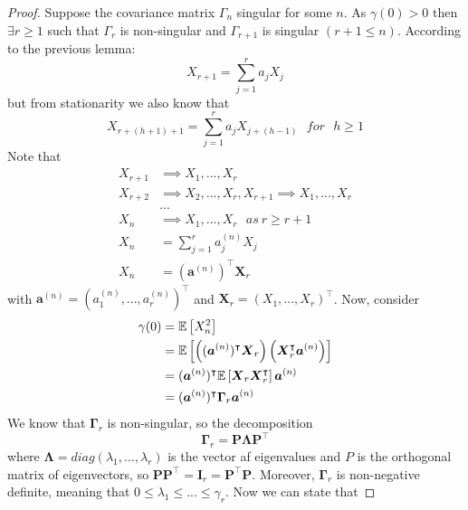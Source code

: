 \begin{proof}
    Suppose the covariance matrix $\Gamma_n$ singular for some $n$. As $\gamma(0)>0$ then $\exists r\ge1$ such that $\Gamma_r$ is non-singular and $\Gamma_{r+1}$ is singular $(r+1\le n)$. According to the previous lemma:
    \[
        X_{r+1}=\sum_{j=1}^ra_jX_j  
    \]
    but from stationarity we also know that
    \[
        X_{r+(h+1)+1}=\sum_{j=1}^ra_jX_{j+(h-1)}\ \ \ for\ \ \ h\ge1  
    \]
    Note that
    \begin{equation*}
        \begin{split}
            X_{r+1}&\implies X_1,...,X_r\\
            X_{r+2}&\implies X_2,...,X_r,X_{r+1}\implies X_1,...,X_r\\
            &...\\
            X_n&\implies X_1,...,X_r\ \ \ as\ r\ge r+1\\
            X_n&=\sum_{j=1}^ra_j^{(n)}X_j\\
            X_n&=(\boldsymbol{a}^{(n)})^\intercal \boldsymbol{X}_r
        \end{split}
    \end{equation*}
    with $\boldsymbol{a}^{(n)}=(a_1^{(n)},...,a_r^{(n)})^\intercal$ and $\boldsymbol{X}_r=(X_1,...,X_r)^\intercal$. Now, consider
    \begin{equation*}
        \begin{split}
            \gamma(0)&=\mathbb{E}\left[X_n^2\right]\\
            &=\mathbb{E}\left[\left((\boldsymbol{a}^{(n)})^\intercal\boldsymbol{X}_r\right)\left(\boldsymbol{X}_r^\intercal\boldsymbol{a}^{(n)}\right)\right]\\
            &=(\boldsymbol{a}^{(n)})^\intercal\mathbb{E}\left[\boldsymbol{X}_r\boldsymbol{X}_r^\intercal\right]\boldsymbol{a}^{(n)}\\
            &=(\boldsymbol{a}^{(n)})^\intercal\boldsymbol{\Gamma}_r\boldsymbol{a}^{(n)}\\
        \end{split}
    \end{equation*}
    We know that $\boldsymbol{\Gamma}_r$ is non-singular, so the decomposition
    \[
        \boldsymbol{\Gamma}_r=\boldsymbol{P}\boldsymbol{\Lambda}\boldsymbol{P}^\intercal
    \]
    where $\boldsymbol{\Lambda}=diag(\lambda_1,...,\lambda_r)$ is the vector af eigenvalues and $P$ is the orthogonal matrix of eigenvectors, so $\boldsymbol{P}\boldsymbol{P}^\intercal=\boldsymbol{I}_r=\boldsymbol{P}^\intercal\boldsymbol{P}$. Moreover, $\boldsymbol{\Gamma}_r$ is non-negative definite, meaning that $0\le\lambda_1\le...\le\gamma_r$. Now we can state that

\end{proof}
